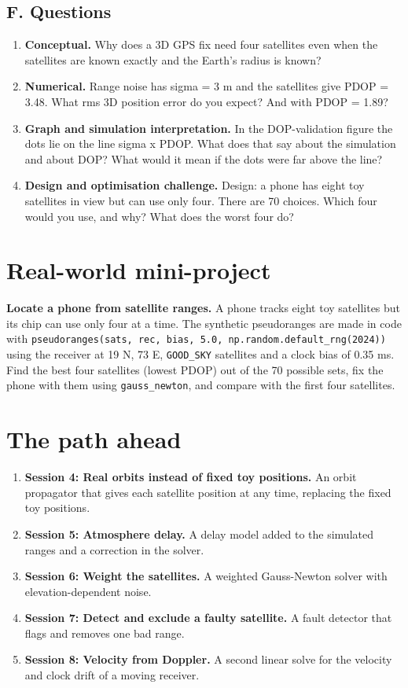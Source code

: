 \documentclass[11pt,a4paper]{article}
\begin{document}
\subsection*{F. Questions}
\begin{enumerate}[nosep]
\item \textbf{Conceptual.} Why does a 3D GPS fix need four satellites even when the satellites are known exactly and the Earth's radius is known?
\item \textbf{Numerical.} Range noise has sigma = 3 m and the satellites give PDOP = 3.48. What rms 3D position error do you expect? And with PDOP = 1.89?
\item \textbf{Graph and simulation interpretation.} In the DOP-validation figure the dots lie on the line sigma x PDOP. What does that say about the simulation and about DOP? What would it mean if the dots were far above the line?
\item \textbf{Design and optimisation challenge.} Design: a phone has eight toy satellites in view but can use only four. There are 70 choices. Which four would you use, and why? What does the worst four do?
\end{enumerate}

\section{Real-world mini-project}
\textbf{Locate a phone from satellite ranges.} A phone tracks eight toy satellites but its chip can use only four at a time. The synthetic pseudoranges are made in code with \texttt{pseudoranges(sats, rec, bias, 5.0, np.random.default\_rng(2024))} using the receiver at 19 N, 73 E, \texttt{GOOD\_SKY} satellites and a clock bias of 0.35 ms. Find the best four satellites (lowest PDOP) out of the 70 possible sets, fix the phone with them using \texttt{gauss\_newton}, and compare with the first four satellites.

\section{The path ahead}
\begin{enumerate}[nosep]
\item \textbf{Session 4: Real orbits instead of fixed toy positions.} An orbit propagator that gives each satellite position at any time, replacing the fixed toy positions.
\item \textbf{Session 5: Atmosphere delay.} A delay model added to the simulated ranges and a correction in the solver.
\item \textbf{Session 6: Weight the satellites.} A weighted Gauss-Newton solver with elevation-dependent noise.
\item \textbf{Session 7: Detect and exclude a faulty satellite.} A fault detector that flags and removes one bad range.
\item \textbf{Session 8: Velocity from Doppler.} A second linear solve for the velocity and clock drift of a moving receiver.
\end{enumerate}
\end{document}
